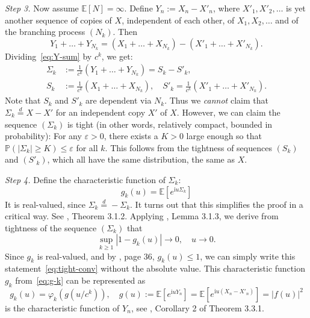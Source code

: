 \documentclass[12pt]{amsart}
\theoremstyle{remark}
\theoremstyle{definition}
\begin{document}
{\it Step 3.} Now assume $\mathbb E[N] = \infty$. Define $Y_n := X_n - X'_n$, where $X'_1, X'_2, \ldots$ is yet another sequence of copies of $X$, independent of each other, of $X_1, X_2, \ldots$ and of the branching process $(N_k)$. Then 
\begin{equation}
\label{eq:Y-sum}
Y_1 + \ldots + Y_{N_k} = \left(X_1 + \ldots + X_{N_k}\right) - \left(X'_1 + \ldots + X'_{N_k}\right).
\end{equation}
Dividing~\eqref{eq:Y-sum} by $c^k$, we get:
\begin{align}
\label{eq:Sigma}
\Sigma_k &:= \frac{1}{c^k}\left(Y_1 + \ldots + Y_{N_k}\right) = S_k - S'_k,\\
S_k &:= \frac1{c^k}\left(X_1 + \ldots + X_{N_k}\right),\quad S'_k = \frac1{c^k}\left(X'_1 + \ldots + X'_{N_k}\right).
\end{align}
Note that $S_k$ and $S'_k$ are dependent via $N_k$. Thus we {\it cannot} claim that $\Sigma_k \stackrel{d}{=} X - X'$ for an independent copy $X'$ of $X$. However, we can claim the sequence $(\Sigma_k)$ is tight (in other words, relatively compact, bounded in probability): For any $\varepsilon > 0$, there exists a $K > 0$ large enough so that $\mathbb P(|\Sigma_k| \ge K) \le \varepsilon$ for all $k$. This follows from the tightness of sequences $(S_k)$ and $(S'_k)$, which all have the same distribution, the same as $X$. 

{\it Step 4.} Define the characteristic function of $\Sigma_k$:
\begin{equation}
\label{eq:g-k}
g_k(u) = \mathbb E\left[e^{\mathrm{i}u\Sigma_k}\right]
\end{equation}
It is real-valued, since $\Sigma_k \stackrel{d}{=} -\Sigma_k$. It turns out that this simplifies the proof in a critical way. See \cite[Chapter 3]{FTbook}, Theorem 3.1.2. Applying \cite[Chapter 3]{Stroock}, Lemma 3.1.3, we derive from tightness of the sequence $(\Sigma_k)$ that 
\begin{equation}
\label{eq:tight-conv}
\sup\limits_{k \ge 1}|1 - g_k(u)| \to 0,\quad u \to 0.
\end{equation}
Since $g_k$ is real-valued, and by \cite[Chapter 2]{FTbook}, page 36, $g_k(u) \le 1$, we can simply write this statement~\eqref{eq:tight-conv} without the absolute value. This characteristic function $g_k$ from~\eqref{eq:g-k} can be represented as 
\begin{equation}
\label{eq:g-f}
g_k(u) = \varphi_k(g(u/c^k)),\quad g(u) := \mathbb E\left[e^{\mathrm{i}uY_n}\right] = \mathbb E\left[e^{\mathrm{i}u(X_n - X'_n)}\right] = |f(u)|^2
\end{equation}
is the characteristic function of $Y_n$, see \cite[Chapter 3]{FTbook}, Corollary 2 of Theorem 3.3.1. 
\end{document}
